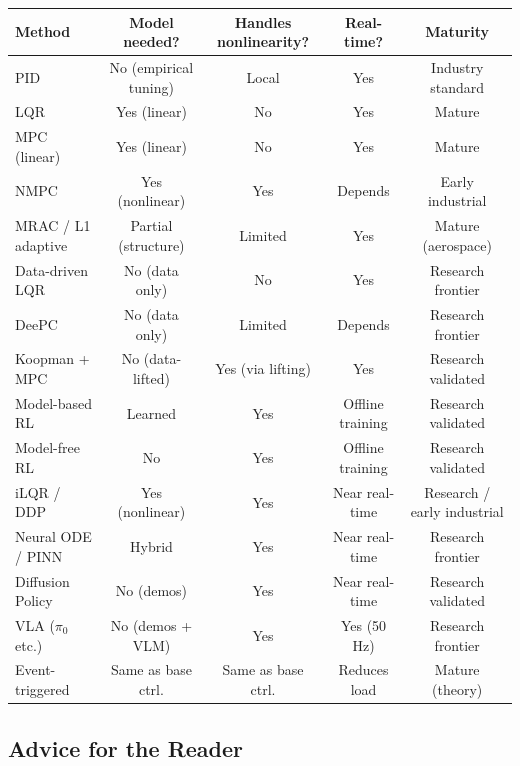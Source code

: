 \begin{center}
\footnotesize
\begin{tabular}{l c c c c}
\toprule
\textbf{Method} & \textbf{Model needed?} & \textbf{Handles nonlinearity?} & \textbf{Real-time?} & \textbf{Maturity} \\
\midrule
PID & No (empirical tuning) & Local & Yes & Industry standard \\
LQR & Yes (linear) & No & Yes & Mature \\
MPC (linear) & Yes (linear) & No & Yes & Mature \\
NMPC & Yes (nonlinear) & Yes & Depends & Early industrial \\
MRAC / L1 adaptive & Partial (structure) & Limited & Yes & Mature (aerospace) \\
Data-driven LQR & No (data only) & No & Yes & Research frontier \\
DeePC & No (data only) & Limited & Depends & Research frontier \\
Koopman + MPC & No (data-lifted) & Yes (via lifting) & Yes & Research validated \\
Model-based RL & Learned & Yes & Offline training & Research validated \\
Model-free RL & No & Yes & Offline training & Research validated \\
iLQR / DDP & Yes (nonlinear) & Yes & Near real-time & Research / early industrial \\
Neural ODE / PINN & Hybrid & Yes & Near real-time & Research frontier \\
Diffusion Policy & No (demos) & Yes & Near real-time & Research validated \\
VLA ($\pi_0$ etc.) & No (demos + VLM) & Yes & Yes (50 Hz) & Research frontier \\
Event-triggered & Same as base ctrl. & Same as base ctrl. & Reduces load & Mature (theory) \\
\bottomrule
\end{tabular}
\end{center}

\subsection{Advice for the Reader}

